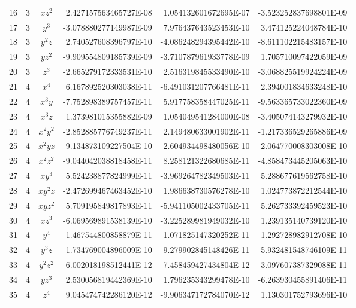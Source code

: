 \documentclass{article}
\begin{document}
\begin{table}[ht!]
\begin{center}
\begin{tabular}{rrcrrr}
16 & 3 & $xz^{2}$ & 2.427157563465727E-08 & 1.054132601672695E-07 & -3.523252837698801E-09 \\ 
17 & 3 & $y^{3}$ & -3.078880277149987E-09 & 7.976437643523453E-10 & 3.474125224048784E-10 \\ 
18 & 3 & $y^{2}z$ & 2.740527608396797E-10 & -4.086248294395442E-10 & -8.611102215483157E-10 \\ 
19 & 3 & $yz^{2}$ & -9.909554809185739E-09 & -3.710787961933778E-09 & 1.705710097422059E-09 \\ 
20 & 3 & $z^{3}$ & -2.665279172333531E-10 & 2.516319845533490E-10 & -3.068825519924224E-09 \\ 
21 & 4 & $x^{4}$ & 6.167892520303038E-11 & -6.491031207766481E-11 & 2.394001834633248E-10 \\ 
22 & 4 & $x^{3}y$ & -7.752898389757457E-11 & 5.917758358447025E-11 & -9.563365733022360E-09 \\ 
23 & 4 & $x^{3}z$ & 1.373981015355882E-09 & 1.054049541284000E-08 & -3.405074143279932E-10 \\ 
24 & 4 & $x^{2}y^{2}$ & -2.852885776749237E-11 & 2.149480633001902E-11 & -1.217336529265886E-09 \\ 
25 & 4 & $x^{2}yz$ & -9.134873109227504E-10 & -2.604934498480056E-10 & 2.064770008303008E-10 \\ 
26 & 4 & $x^{2}z^{2}$ & -9.044042038818458E-11 & 8.258121322680685E-11 & -4.858473445205063E-10 \\ 
27 & 4 & $xy^{3}$ & 5.524238877824999E-11 & -3.969264782349503E-11 & 5.288677619562758E-10 \\ 
28 & 4 & $xy^{2}z$ & -2.472699467463452E-10 & 1.986638730576278E-10 & 1.024773872212544E-10 \\ 
29 & 4 & $xyz^{2}$ & 5.709195849817893E-11 & -5.941105002433705E-11 & 5.262733392459523E-10 \\ 
30 & 4 & $xz^{3}$ & -6.069569891538139E-10 & -3.225289981949032E-10 & 1.239135140739120E-10 \\ 
31 & 4 & $y^{4}$ & -1.467544800858879E-11 & 1.071825147320252E-11 & -1.292728982912708E-10 \\ 
32 & 4 & $y^{3}z$ & 1.734769004896009E-10 & 9.279902845148426E-11 & -5.932481548746109E-11 \\ 
33 & 4 & $y^{2}z^{2}$ & -6.002018198512441E-12 & 7.458459427434804E-12 & -3.097607387329088E-11 \\ 
34 & 4 & $yz^{3}$ & 2.530056819442369E-10 & 1.796235343299478E-10 & -6.263930455891406E-11 \\ 
35 & 4 & $z^{4}$ & 9.045474742286120E-12 & -9.906347172784070E-12 & 1.130301752793696E-10 \\ 

\end{tabular}
\end{center}
\end{table}
\end{document}
